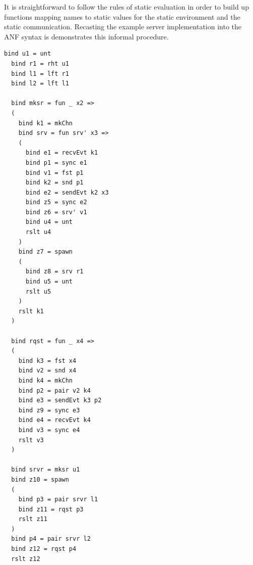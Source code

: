 \documentclass[10pt]{article}
\begin{document}
It is straightforward to follow the rules of static evaluation in order to build up
functions mapping names to static values for the static environment
and the static communication.
Recasting the example server implementation into the
ANF syntax is demonstrates this
informal procedure.

\begin{lstlisting}[language=normal_lang, mathescape]
  bind u1 = unt
  bind r1 = rht u1
  bind l1 = lft r1
  bind l2 = lft l1

  bind mksr = fun _ x2 => 
  (
    bind k1 = mkChn
    bind srv = fun srv' x3 =>
    (
      bind e1 = recvEvt k1
      bind p1 = sync e1
      bind v1 = fst p1
      bind k2 = snd p1 
      bind e2 = sendEvt k2 x3
      bind z5 = sync e2
      bind z6 = srv' v1
      bind u4 = unt
      rslt u4
    )
    bind z7 = spawn
    (
      bind z8 = srv r1
      bind u5 = unt
      rslt u5
    )
    rslt k1
  )

  bind rqst = fun _ x4 =>
  (
    bind k3 = fst x4
    bind v2 = snd x4
    bind k4 = mkChn
    bind p2 = pair v2 k4
    bind e3 = sendEvt k3 p2
    bind z9 = sync e3
    bind e4 = recvEvt k4
    bind v3 = sync e4
    rslt v3
  )

  bind srvr = mksr u1
  bind z10 = spawn
  ( 
    bind p3 = pair srvr l1
    bind z11 = rqst p3
    rslt z11
  )
  bind p4 = pair srvr l2
  bind z12 = rqst p4
  rslt z12
\end{lstlisting}
\end{document}
